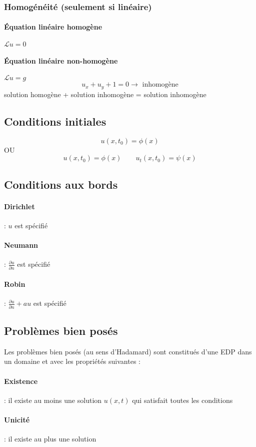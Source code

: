 \documentclass[resume]{subfiles}
\begin{document}
\subsubsection{Homogénéité (seulement si linéaire)}
\paragraph{Équation linéaire homogène} $\mathcal{L}u=0$
\paragraph{Équation linéaire non-homogène} $\mathcal{L}u=g$
$$u_x+u_y+1=0\longrightarrow \text{ inhomogène}$$
solution homogène + solution inhomogène = solution inhomogène
\subsection{Conditions initiales}
$$u(x,t_0)=\phi(x)$$
OU
$$u(x,t_0)=\phi(x)\qquad u_t(x,t_0)=\psi(x)$$
\subsection{Conditions aux bords}
\paragraph{Dirichlet} : $u$ est spécifié
\paragraph{Neumann} : $\frac{\partial u}{\partial n}$ est spécifié
\paragraph{Robin} : $\frac{\partial u}{\partial n}+au$ est spécifié
\subsection{Problèmes bien posés}
Les problèmes bien posés (au sens d'Hadamard) sont constitués d'une EDP dans un domaine et avec les propriétés suivantes :
\paragraph{Existence} : il existe au moins une solution $u(x,t)$ qui satisfait toutes les conditions
\paragraph{Unicité} : il existe au plus une solution
\end{document}
